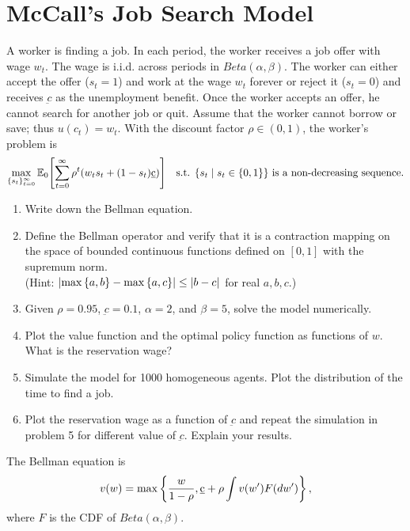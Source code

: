 \documentclass[12pt]{article}
\begin{document}
\section{McCall's Job Search Model}
A worker is finding a job. In each period, the worker receives 
a job offer with wage $w_t$. The wage is i.i.d. across periods 
in $Beta(\alpha,\beta)$. The worker can either 
accept the offer ($s_t=1$) and work at the wage $w_t$ forever 
or reject it ($s_t=0$) and receives $\underbar{c}$ as the 
unemployment benefit. Once the worker accepts an offer, he 
cannot search for another job or quit. Assume that the worker 
cannot borrow or save; thus $u(c_t)=w_t$. 
With the discount factor $\rho\in(0,1)$, the worker's problem 
is 
\begin{equation*}
    \max_{\{s_t\}_{t=0}^\infty} \E_0\sbrc{\sum_{t=0}^\infty \rho^t(w_ts_t+(1-s_t)\underbar{c})}\quad \text{s.t. $\Set{s_t}{s_t\in\set{0,1}}$ is a non-decreasing sequence}.
\end{equation*}
\begin{enumerate}
    \item Write down the Bellman equation.
    \item Define the Bellman operator and verify that it is a 
    contraction mapping on the space of bounded continuous functions 
    defined on $[0,1]$ with the supremum norm.\\
    (Hint: $\left\lvert {\max\left\{ {a,b} \right\}-\max\left\{ {a,c} \right\}} \right\rvert\leq\left\lvert {b-c} \right\rvert$ for real $a,b,c$.)
    \item Given $\rho = 0.95$, $\underbar{c} = 0.1$, $\alpha = 2$, 
    and $\beta = 5$, solve the model numerically.
    \item Plot the value function and the optimal policy function as functions 
    of $w$. What is the reservation wage? 
    \item Simulate the model for 1000 homogeneous agents. Plot the distribution 
    of the time to find a job. 
    \item Plot the reservation wage as a function of $\underbar{c}$ and repeat 
    the simulation in problem 5 for different value of $\underbar{c}$. Explain 
    your results.
\end{enumerate}
\begin{sol}[4.1]
    The Bellman equation is 
    \begin{equation*}
        v(w) = \max \left\{ {\frac{w}{1-\rho}, \underbar{c} + \rho \int v(w') F(dw')} \right\},
    \end{equation*}
    where $F$ is the CDF of $Beta(\alpha,\beta)$.
    \solend
\end{sol}
\end{document}
